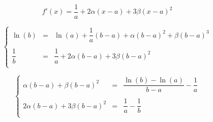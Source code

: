 \documentclass[aps]{revtex4}
\begin{document}
\begin{equation}
	 f'(x) = \dfrac{1}{a} + 2 \alpha (x-a) + 3 \beta (x-a)^2
\end{equation}

\begin{equation}
\left\lbrace
	\begin{array}{rcl}
	\ln(b) & = & \ln(a) + \dfrac{1}{a} (b-a) + \alpha (b-a)^2 + \beta (b-a)^3\\
	\\
	\dfrac{1}{b} & = & \dfrac{1}{a} + 2\alpha(b-a) + 3\beta(b-a)^2\\
	\end{array}
\right.
\end{equation}

\begin{equation}
\left\lbrace
	\begin{array}{rcl}
	\alpha (b-a) + \beta (b-a)^2 & = & \dfrac{\ln(b) - \ln(a)}{b-a} - \dfrac{1}{a}\\
	\\
	2\alpha(b-a)  + 3\beta(b-a)^2  & = & \dfrac{1}{a}-\dfrac{1}{b}  \\
	\end{array}
\right.
\end{equation}
\end{document}
